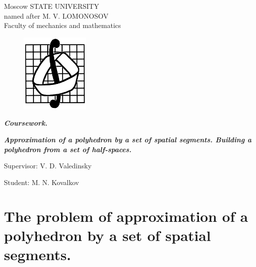 \documentclass[11pt,fleqn,a4paper]{scrartcl}
\begin{document}
\begin{center}
Moscow STATE UNIVERSITY \\ named after M. V. LOMONOSOV\\ Faculty of mechanics and mathematics
\end{center}
\begin{figure}[htbp]
\centering
\includegraphics[width=0.3\textwidth]{36cacac6.png}
\end{figure}
\begin{center}
\textbf{\large{\textit{Coursework.}}}
\end{center}
\textbf{\large{\textit{Approximation of a polyhedron by a set of spatial segments. Building a polyhedron from a set of half-spaces.}}} \\
\begin{flushright} {Supervisor: V. D. Valedinsky\\ }\end{flushright}
\begin{flushright} {Student: M. N. Kovalkov\\ }\end{flushright}
\newpage
\tableofcontents
\newpage
\section{The problem of approximation of a polyhedron by a set of spatial segments.}
\end{document}
